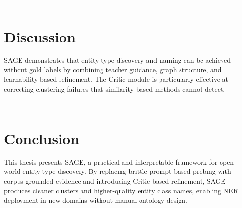 \documentclass[14pt]{extreport}
\begin{document}
---

\section{Discussion}

SAGE demonstrates that entity type discovery and naming can be achieved without gold labels by combining teacher guidance, graph structure, and learnability-based refinement. The Critic module is particularly effective at correcting clustering failures that similarity-based methods cannot detect.

---

\section{Conclusion}

This thesis presents SAGE, a practical and interpretable framework for open-world entity type discovery. By replacing brittle prompt-based probing with corpus-grounded evidence and introducing Critic-based refinement, SAGE produces cleaner clusters and higher-quality entity class names, enabling NER deployment in new domains without manual ontology design.
\end{document}
